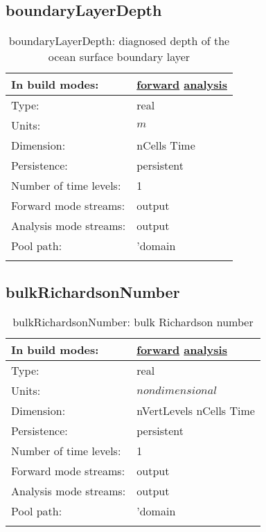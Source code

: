 \subsection[boundaryLayerDepth]{boundaryLayerDepth}
\label{subsec:var_sec_diagnostics_boundaryLayerDepth}
\begin{center}
\begin{longtable}{| p{2.0in} | p{4.0in} |}
        \hline 
        In build modes: & \hyperref[subsec:forward_var_tab_diagnostics]{forward} \hyperref[subsec:analysis_var_tab_diagnostics]{analysis} \\
        \hline 
        Type: & real \\
        \hline 
        Units: & $m$ \\
        \hline 
        Dimension: & nCells Time \\
        \hline 
        Persistence: & persistent \\
        \hline 
        Number of time levels: & 1 \\
        \hline 
		 Forward mode streams: &  output \\
        \hline 
		 Analysis mode streams: &  output \\
        \hline 
            Pool path: & 'domain %
 \\
		 \hline 
    \caption{boundaryLayerDepth: diagnosed depth of the ocean surface boundary layer}
\end{longtable}
\end{center}
\subsection[bulkRichardsonNumber]{bulkRichardsonNumber}
\label{subsec:var_sec_diagnostics_bulkRichardsonNumber}
\begin{center}
\begin{longtable}{| p{2.0in} | p{4.0in} |}
        \hline 
        In build modes: & \hyperref[subsec:forward_var_tab_diagnostics]{forward} \hyperref[subsec:analysis_var_tab_diagnostics]{analysis} \\
        \hline 
        Type: & real \\
        \hline 
        Units: & $nondimensional$ \\
        \hline 
        Dimension: & nVertLevels nCells Time \\
        \hline 
        Persistence: & persistent \\
        \hline 
        Number of time levels: & 1 \\
        \hline 
		 Forward mode streams: &  output \\
        \hline 
		 Analysis mode streams: &  output \\
        \hline 
            Pool path: & 'domain %
 \\
		 \hline 
    \caption{bulkRichardsonNumber: bulk Richardson number}
\end{longtable}
\end{center}
